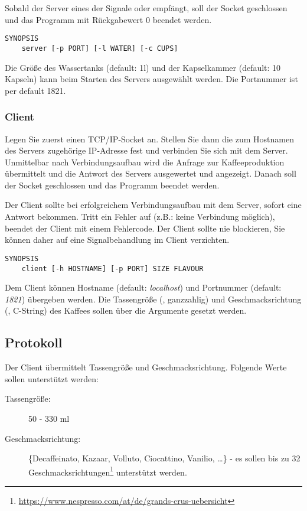 Sobald der Server eines der Signale  oder
 empfängt, soll der Socket geschlossen und das
Programm mit Rückgabewert 0 beendet werden.

\begin{verbatim}
SYNOPSIS
    server [-p PORT] [-l WATER] [-c CUPS]
\end{verbatim}

Die Größe des Wassertanks (default: 1l) und der Kapselkammer (default: 10
Kapseln) kann beim Starten des Servers ausgewählt werden. Die Portnummer ist
per default 1821.

\subsubsection*{Client}
Legen Sie zuerst einen TCP/IP-Socket an. Stellen Sie dann die zum Hostnamen des
Servers zugehörige IP-Adresse fest und verbinden Sie sich mit dem
Server. Unmittelbar nach Verbindungsaufbau wird die Anfrage zur
Kaffeeproduktion übermittelt und die Antwort des Servers ausgewertet und
angezeigt. Danach soll der Socket geschlossen und das Programm beendet werden.

Der Client sollte bei erfolgreichem Verbindungsaufbau mit dem Server, sofort
eine Antwort bekommen. Tritt ein Fehler auf (z.B.: keine Verbindung möglich),
beendet der Client mit einem Fehlercode. Der Client sollte nie blockieren, Sie
können daher auf eine Signalbehandlung im Client verzichten.

\begin{verbatim}
SYNOPSIS
    client [-h HOSTNAME] [-p PORT] SIZE FLAVOUR
\end{verbatim}

Dem Client können Hostname (default: \emph{localhost}) und Portnummer (default:
\emph{1821}) übergeben werden. Die Tassengröße (, ganzzahlig)
und Geschmacksrichtung (, C-String) des Kaffees sollen über
die Argumente gesetzt werden.

\subsection*{Protokoll}
\label{sec:prot}
Der Client übermittelt Tassengröße und Geschmacksrichtung. Folgende Werte
sollen unterstützt werden:
%
\begin{description}
\item[Tassengröße:] 50 - 330 ml
\item[Geschmacksrichtung:] \{Decaffeinato, Kazaar, Volluto, Ciocattino,
  Vanilio, \dots\} - es sollen bis zu 32
  Geschmacksrichtungen\footnote{\url{https://www.nespresso.com/at/de/grands-crus-uebersicht}}
  unterstützt werden.
\end{description}

